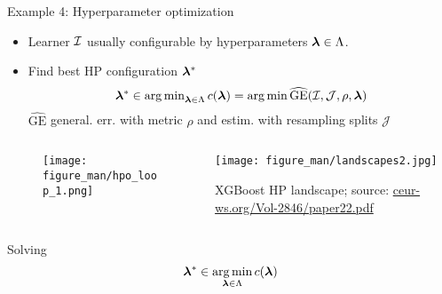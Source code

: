 \documentclass[11pt,compress,t,notes=noshow, xcolor=table]{beamer}
\begin{document}
\begin{vbframe}{Example 4: Hyperparameter optimization}

\begin{itemize}
	\item Learner $\mathcal{I}$ usually configurable by hyperparameters $\bm{\lambda} \in \Lambda$. 
	\item Find best HP configuration $\bm{\lambda}^\ast$ 
	$$
	\bm{\lambda}^\ast \in \operatorname*{arg\,min}\nolimits_{\bm{\lambda} \in \Lambda} c(\bm{\lambda}) = \operatorname*{arg\,min} \widehat{\text{GE}}(\mathcal{I}, \mathcal{J}, \rho, \bm{\lambda})
	$$
	$\widehat{\text{GE}}$ general. err. with metric $\rho$ and estim. with resampling splits $\mathcal{J}$ 
\end{itemize}

\vspace*{-0.2cm}

\begin{columns}
\begin{column}{0.6\textwidth}

\begin{figure}[h]
	\centering
	\texttt{[image: figure\_man/hpo\_loop\_1.png]}
\end{figure}
\end{column}
\begin{column}{0.4\textwidth}
		\begin{center}
\texttt{[image: figure\_man/landscapes2.jpg]}
\begin{tiny}{XGBoost HP landscape; source: \url{ceur-ws.org/Vol-2846/paper22.pdf}}\end{tiny}
\end{center}
\end{column}
\end{columns}

\framebreak 
		
Solving 
\vspace*{-0.2cm}
$$
\bm{\lambda}^\ast \in \operatorname*{arg\,min}_{\bm{\lambda} \in \Lambda} c(\bm{\lambda})
$$


\end{vbframe}
\end{document}
